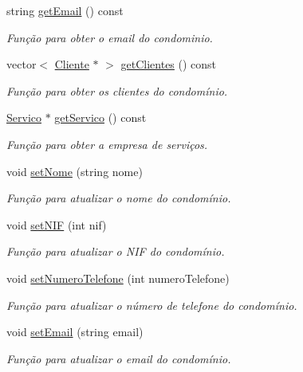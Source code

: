 \begin{DoxyCompactItemize}
string \hyperlink{class_condominio_adc4a6fa8a9fcb43a65226b722b7929d0}{get\+Email} () const 
\begin{DoxyCompactList}\small\item\em Função para obter o email do condominio. \end{DoxyCompactList}\item 
vector$<$ \hyperlink{class_cliente}{Cliente} $\ast$ $>$ \hyperlink{class_condominio_a6a9100e8a8a48847785f4c4b108ab8db}{get\+Clientes} () const 
\begin{DoxyCompactList}\small\item\em Função para obter os clientes do condomínio. \end{DoxyCompactList}\item 
\hyperlink{class_servico}{Servico} $\ast$ \hyperlink{class_condominio_abb987c983caf8468935773b00505a5e2}{get\+Servico} () const 
\begin{DoxyCompactList}\small\item\em Função para obter a empresa de serviços. \end{DoxyCompactList}\item 
void \hyperlink{class_condominio_a64353c4a20129888074cdc9526cdc04b}{set\+Nome} (string nome)
\begin{DoxyCompactList}\small\item\em Função para atualizar o nome do condomínio. \end{DoxyCompactList}\item 
void \hyperlink{class_condominio_a89d828306fcbcc0df34d52e07b7e9bb7}{set\+N\+IF} (int nif)
\begin{DoxyCompactList}\small\item\em Função para atualizar o N\+IF do condomínio. \end{DoxyCompactList}\item 
void \hyperlink{class_condominio_a7f454a535fe1ebc3ab244415d963b719}{set\+Numero\+Telefone} (int numero\+Telefone)
\begin{DoxyCompactList}\small\item\em Função para atualizar o número de telefone do condomínio. \end{DoxyCompactList}\item 
void \hyperlink{class_condominio_ae0521eb8186f3c4000cc8c0fa6d4b762}{set\+Email} (string email)
\begin{DoxyCompactList}\small\item\em Função para atualizar o email do condomínio. \end{DoxyCompactList}\end{DoxyCompactItemize}


